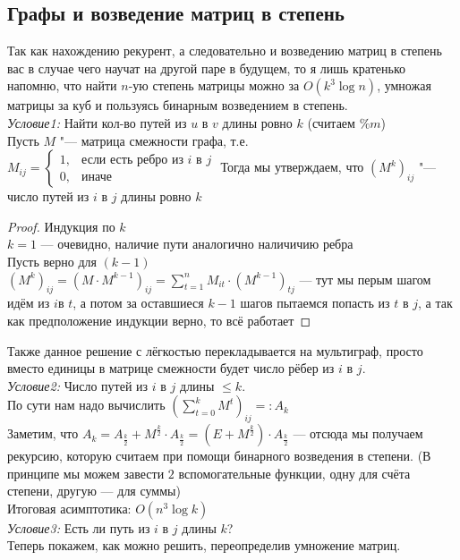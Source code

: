 \documentclass[a4paper, 12pt]{article}
\theoremstyle{plain}
\theoremstyle{definition}
\theoremstyle{remark}
\begin{document}
\subsection{Графы и возведение матриц в степень}
Так как нахождению рекурент, а следовательно и возведению матриц в степень вас в случае чего научат на другой паре в будущем, то я лишь кратенько напомню, что найти $n$-ую степень матрицы можно за $O(k^3\log n)$, умножая матрицы за куб и пользуясь бинарным возведением в степень.\\
\textit{Условие1:} Найти кол-во путей из $u$ в $v$ длины ровно $k$ (считаем $\% m$)\\
Пусть $M$ "--- матрица смежности графа, т.е. $M_{ij}=\begin{cases}
	1, &\text{если есть ребро из }i \text{ в } j\\
	0, &\text{иначе}
\end{cases}$
Тогда мы утверждаем, что $(M^k)_{ij}$ "--- число путей из $i$ в $j$ длины ровно $k$
\begin{proof}
	Индукция по $k$\\
	$k=1$ --- очевидно, наличие пути аналогично наличичию ребра\\
	Пусть верно для $(k-1)$\\
	$(M^k)_{ij}=(M\cdot M^{k-1})_{ij}=\sum\limits_{t=1}^nM_{it}\cdot (M^{k-1})_{tj}$ --- тут мы перым шагом идём из $i$в $t$, а потом за оставшиеся $k-1$ шагов пытаемся попасть из $t$ в $j$, а так как предположение индукции верно, то всё работает
\end{proof}
Также данное решение с лёгкостью перекладывается на мультиграф, просто вместо единицы в матрице смежности будет число рёбер из $i$ в $j$.\\
\textit{Условие2:} Число путей из $i$ в $j$ длины $\leq k$.\\
По сути нам надо вычислить $\left(\sum\limits_{t=0}^kM^t\right)_{ij}=:A_k$\\
Заметим, что $A_k=A_{\frac{k}{2}}+M^{\frac{k}{2}}\cdot A_{\frac{k}{2}}=\left(E+M^{\frac{k}{2}}\right)\cdot A_{\frac{k}{2}}$ --- отсюда мы получаем рекурсию, которую считаем при помощи бинарного возведения в степени. (В принципе мы можем завести $2$ вспомогательные функции, одну для счёта степени, другую --- для суммы)\\
Итоговая асимптотика: $O(n^3\log k)$\\
\textit{Условие3:} Есть ли путь из $i$ в $j$ длины $k$?\\
Теперь покажем, как можно решить, переопределив умножение матриц.\\
\end{document}
